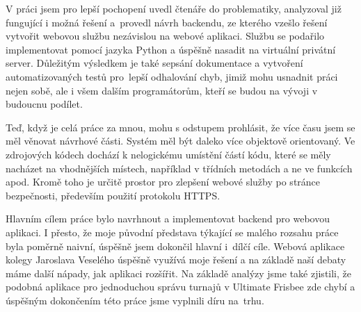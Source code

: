 \begin{conclusion}


  V práci jsem pro lepší pochopení uvedl čtenáře do problematiky, analyzoval již fungující i možná řešení
  a~provedl návrh backendu, ze kterého vzešlo řešení vytvořit webovou službu nezávislou na webové aplikaci.
  Službu se podařilo implementovat pomocí jazyka Python a úspěšně nasadit na virtuální privátní server.
  Důležitým výsledkem je také sepsání dokumentace a vytvoření automatizovaných testů pro~lepší odhalování chyb,
  jimiž mohu usnadnit práci nejen sobě, ale i všem dalším programátorům, kteří se budou na vývoji v budoucnu podílet. %
  
  Teď, když je celá práce za mnou, mohu s odstupem prohlásit, že více času jsem se měl věnovat návrhové části.
  Systém měl být daleko více objektově orientovaný. Ve zdrojových kódech dochází k nelogickému umístění částí kódu,
  které se měly nacházet na vhodnějších místech, například v třídních metodách a ne ve funkcích apod.
  Kromě toho je určitě prostor pro zlepšení webové služby po stránce bezpečnosti, především použití protokolu HTTPS.
  
  Hlavním cílem práce bylo navrhnout a implementovat backend pro webovou aplikaci. I přesto, že moje původní představa
  týkající se malého rozsahu práce byla poměrně naivní, úspěšně jsem dokončil hlavní i~dílčí cíle. Webová aplikace kolegy Jaroslava Veselého
  úspěšně využívá moje řešení a na základě naší debaty máme další nápady, jak aplikaci rozšířit. Na základě analýzy jsme také zjistili,
  že podobná aplikace pro jednoduchou správu turnajů v Ultimate Frisbee zde chybí a úspěšným dokončením této práce jsme vyplnili díru na~trhu.  
\end{conclusion}